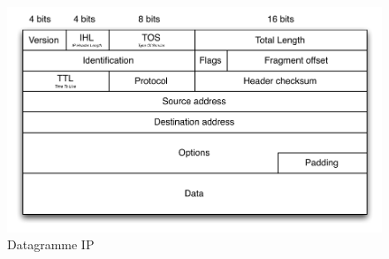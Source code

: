\documentclass[11pt,english,french]{scrreprt}
\theoremstyle{remark}
\theoremstyle{definition}
\begin{document}
\begin{figure}[h!]
	\center
	\includegraphics[scale=.75]{graphes/IP/IP}
	\caption{Datagramme IP}
\end{figure}
\end{document}
